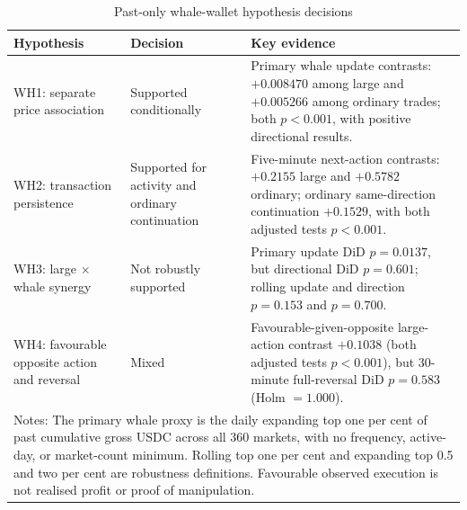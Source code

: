 \begin{table}[htbp]
\centering
\caption{Past-only whale-wallet hypothesis decisions}
\label{tab:whale-wallet-decisions}
\small
\begin{tabular}{p{}p{}p{}}
\hline
Hypothesis & Decision & Key evidence \\
\hline
WH1: separate price association & Supported conditionally & Primary whale update contrasts: $+0.008470$ among large and $+0.005266$ among ordinary trades; both $p<0.001$, with positive directional results. \\ \hline
WH2: transaction persistence & Supported for activity and ordinary continuation & Five-minute next-action contrasts: $+0.2155$ large and $+0.5782$ ordinary; ordinary same-direction continuation $+0.1529$, with both adjusted tests $p<0.001$. \\ \hline
WH3: large $\times$ whale synergy & Not robustly supported & Primary update DiD $p=0.0137$, but directional DiD $p=0.601$; rolling update and direction $p=0.153$ and $p=0.700$. \\ \hline
WH4: favourable opposite action and reversal & Mixed & Favourable-given-opposite large-action contrast $+0.1038$ (both adjusted tests $p<0.001$), but 30-minute full-reversal DiD $p=0.583$ (Holm $=1.000$). \\ \hline
\multicolumn{3}{p{0.94\textwidth}}{\footnotesize Notes: The primary whale proxy is the daily expanding top one per cent of past cumulative gross USDC across all 360 markets, with no frequency, active-day, or market-count minimum. Rolling top one per cent and expanding top 0.5 and two per cent are robustness definitions. Favourable observed execution is not realised profit or proof of manipulation.}
\end{tabular}
\end{table}
